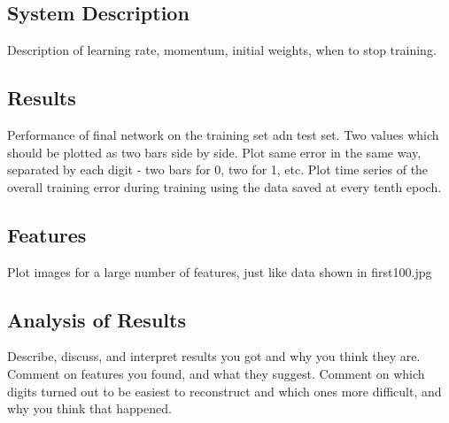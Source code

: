 \documentclass[12pt, letterpaper, twoside]{article}
\begin{document}
\subsection{System Description}
Description of learning rate, momentum, initial weights, when to stop training.

\subsection{Results}
Performance of final network on the training set adn test set. Two values which 
should be plotted as two bars side by side. Plot same error in the same way, separated
by each digit - two bars for 0, two for 1, etc. Plot time series of the overall
training error during training using the data saved at every tenth epoch.

\subsection{Features}
Plot images for a large number of features, just like data shown in first100.jpg

\subsection{Analysis of Results}
Describe, discuss, and interpret results you got and why you think they are. Comment
on features you found, and what they suggest. Comment on which digits turned out to be 
easiest to reconstruct and which ones more difficult, and why you think that happened.
\end{document}
